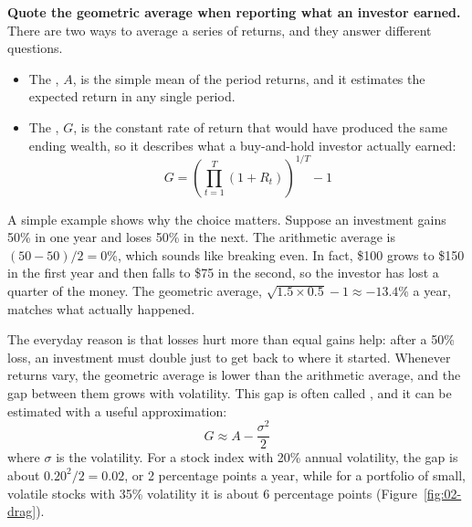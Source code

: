 \textbf{Quote the geometric average when reporting what an investor earned.} There are two ways to average a series of returns, and they answer different questions.

\begin{itemize}
  \item The , $A$, is the simple mean of the period returns, and it estimates the expected return in any single period.
  \item The , $G$, is the constant rate of return that would have produced the same ending wealth, so it describes what a buy-and-hold investor actually earned:
  \begin{equation}
    G = \left(\prod_{t=1}^{T} (1 + R_t)\right)^{1/T} - 1
    \label{eq:02-geometric}
  \end{equation}
\end{itemize}

A simple example shows why the choice matters. Suppose an investment gains 50\% in one year and loses 50\% in the next. The arithmetic average is $(50 - 50)/2 = 0$\%, which sounds like breaking even. In fact, \$100 grows to \$150 in the first year and then falls to \$75 in the second, so the investor has lost a quarter of the money. The geometric average, $\sqrt{1.5 \times 0.5} - 1 \approx -13.4$\% a year, matches what actually happened.

The everyday reason is that losses hurt more than equal gains help: after a 50\% loss, an investment must double just to get back to where it started. Whenever returns vary, the geometric average is lower than the arithmetic average, and the gap between them grows with volatility. This gap is often called , and it can be estimated with a useful approximation:
\begin{equation}
  G \approx A - \frac{\sigma^2}{2}
  \label{eq:02-drag}
\end{equation}
where $\sigma$ is the volatility. For a stock index with 20\% annual volatility, the gap is about $0.20^2/2 = 0.02$, or 2 percentage points a year, while for a portfolio of small, volatile stocks with 35\% volatility it is about 6 percentage points (Figure~\ref{fig:02-drag}).



